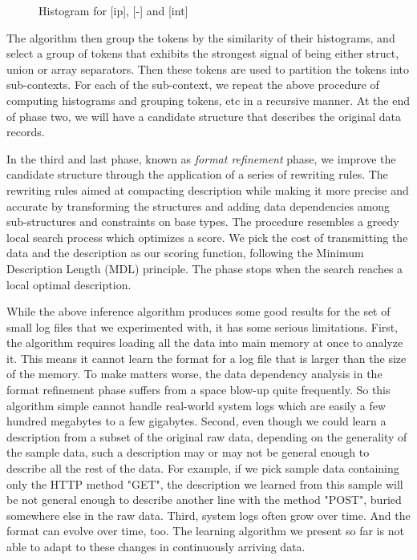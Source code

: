 \begin{figure}[th]
\begin{center}
\caption{Histogram for [ip], [-] and [int]}
\label{fig:histograms}
\end{center}
\end{figure}

The algorithm then group the tokens by the similarity of their histograms,
and select a group of tokens that exhibits the strongest signal of being
either struct, union or array separators. Then these tokens are used 
to partition the tokens into sub-contexts. For each of the sub-context,
we repeat the above procedure of computing histograms and grouping
tokens, etc in a recursive manner. At the end of phase two, we will have
a candidate structure that describes the original data records.

In the third and last phase, known as {\em format refinement} phase,
we improve the candidate structure through the application of a series of
rewriting rules. The rewriting rules aimed at compacting description while
making it more precise and accurate by transforming the structures and 
adding data dependencies among sub-structures and constraints on base types.
The procedure resembles a greedy local search process which optimizes a
score. We pick the cost of transmitting the data and the description as our
scoring function, following the Minimum Description Length (MDL) principle.
The phase stops when the search reaches a local optimal description.

While the above inference algorithm produces some good results for the
set of small log files that we experimented with, it has some serious
limitations. First, the algorithm requires loading all the data into main
memory at once to analyze it. This means it cannot learn the format for a log
file that is larger than the size of the memory. To make matters worse, the
data dependency analysis in the format refinement phase suffers from a space
blow-up quite frequently. So this algorithm simple cannot handle real-world
system logs which are easily a few hundred megabytes to a few gigabytes. 
Second, even though we could learn a description from a subset of the original
raw data, depending on the generality of the sample data, such a description
may or may not be general enough to describe all the rest of the data.
For example, if we pick sample data containing only the HTTP method "GET", 
the description we learned from this sample will be not general enough to 
describe another line with the method "POST", buried somewhere else in the
raw data. Third, system logs often grow over time. And the format can evolve 
over time, too. The learning algorithm we present so far is not able to adapt to 
these changes in continuously arriving data. 

